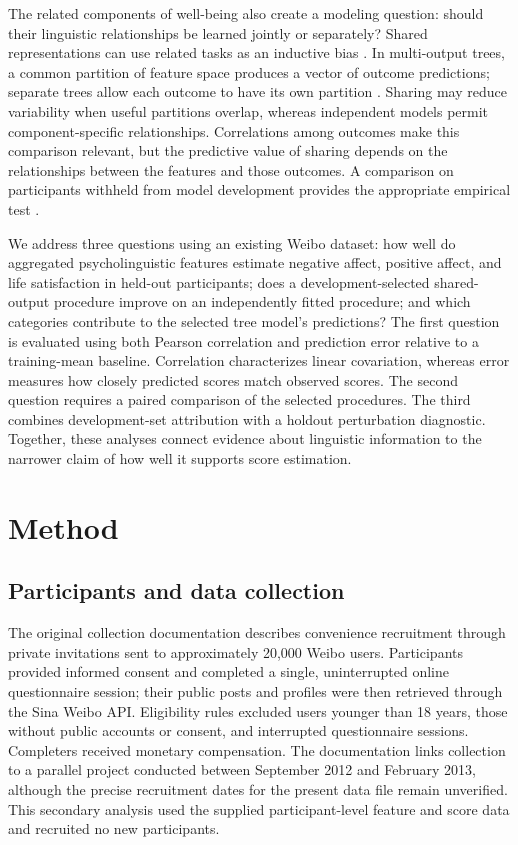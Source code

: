 The related components of well-being also create a modeling question: should their linguistic relationships be learned jointly or separately? Shared representations can use related tasks as an inductive bias \citep{caruana1997}. In multi-output trees, a common partition of feature space produces a vector of outcome predictions; separate trees allow each outcome to have its own partition \citep{kocev2007}. Sharing may reduce variability when useful partitions overlap, whereas independent models permit component-specific relationships. Correlations among outcomes make this comparison relevant, but the predictive value of sharing depends on the relationships between the features and those outcomes. A comparison on participants withheld from model development provides the appropriate empirical test \citep{yarkoni2017}.

We address three questions using an existing Weibo dataset: how well do aggregated psycholinguistic features estimate negative affect, positive affect, and life satisfaction in held-out participants; does a development-selected shared-output procedure improve on an independently fitted procedure; and which categories contribute to the selected tree model's predictions? The first question is evaluated using both Pearson correlation and prediction error relative to a training-mean baseline. Correlation characterizes linear covariation, whereas error measures how closely predicted scores match observed scores. The second question requires a paired comparison of the selected procedures. The third combines development-set attribution with a holdout perturbation diagnostic. Together, these analyses connect evidence about linguistic information to the narrower claim of how well it supports score estimation.

\section{Method}
\subsection{Participants and data collection}
The original collection documentation describes convenience recruitment through private invitations sent to approximately 20,000 Weibo users. Participants provided informed consent and completed a single, uninterrupted online questionnaire session; their public posts and profiles were then retrieved through the Sina Weibo API. Eligibility rules excluded users younger than 18 years, those without public accounts or consent, and interrupted questionnaire sessions. Completers received monetary compensation. The documentation links collection to a parallel project conducted between September 2012 and February 2013, although the precise recruitment dates for the present data file remain unverified. This secondary analysis used the supplied participant-level feature and score data and recruited no new participants.

